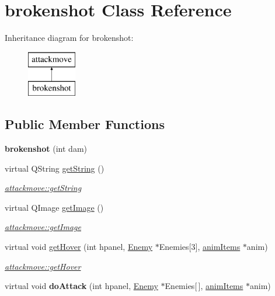 \hypertarget{classbrokenshot}{\section{brokenshot Class Reference}
\label{classbrokenshot}
}
Inheritance diagram for brokenshot\-:\begin{figure}[H]
\begin{center}
\leavevmode
\includegraphics[height=2.000000cm]{classbrokenshot}
\end{center}
\end{figure}
\subsection*{Public Member Functions}
\begin{DoxyCompactItemize}
\item 
\hypertarget{classbrokenshot_aef0d22efead95c42a51a76293cfd91ae}{{\bfseries brokenshot} (int dam)}\label{classbrokenshot_aef0d22efead95c42a51a76293cfd91ae}

\item 
virtual Q\-String \hyperlink{classbrokenshot_a4834069bb57b3bb17a4816888cc83e43}{get\-String} ()
\begin{DoxyCompactList}\small\item\em \hyperlink{classattackmove_ada49eedf4b893372c576edd48fe73161}{attackmove\-::get\-String} \end{DoxyCompactList}\item 
virtual Q\-Image \hyperlink{classbrokenshot_ab5a534dcbeb99a57362e22bd11598a27}{get\-Image} ()
\begin{DoxyCompactList}\small\item\em \hyperlink{classattackmove_aca59a2343b7a6c195d300dda5c8d952d}{attackmove\-::get\-Image} \end{DoxyCompactList}\item 
virtual void \hyperlink{classbrokenshot_a1d9aaa51c4a27d8bb68a8f0678430d3a}{get\-Hover} (int hpanel, \hyperlink{class_enemy}{Enemy} $\ast$Enemies\mbox{[}3\mbox{]}, \hyperlink{classanim_items}{anim\-Items} $\ast$anim)
\begin{DoxyCompactList}\small\item\em \hyperlink{classattackmove_a0ff82349551bd72f4d57b3367bb318fa}{attackmove\-::get\-Hover} \end{DoxyCompactList}\item 
\hypertarget{classbrokenshot_a22b66a06882a1e1761fd796c7548cf50}{virtual void {\bfseries do\-Attack} (int hpanel, \hyperlink{class_enemy}{Enemy} $\ast$Enemies\mbox{[}$\,$\mbox{]}, \hyperlink{classanim_items}{anim\-Items} $\ast$anim)}\label{classbrokenshot_a22b66a06882a1e1761fd796c7548cf50}

\end{DoxyCompactItemize}
